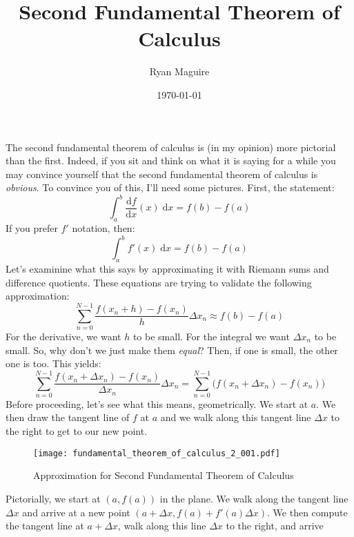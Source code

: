 \documentclass{article}
\title{Second Fundamental Theorem of Calculus}
\author{Ryan Maguire}
\date{\today}
\begin{document}
    \maketitle
    The second fundamental theorem of calculus is (in my opinion) more
    pictorial than the first. Indeed, if you sit and think on what it is saying
    for a while you may convince yourself that the second fundamental theorem
    of calculus is \textit{obvious}. To convince you of this, I'll need some
    pictures. First, the statement:
    \begin{equation}
        \int_{a}^{b}\frac{\textrm{d}f}{\textrm{d}x}(x)\;\textrm{d}x=f(b)-f(a)
    \end{equation}
    If you prefer $f'$ notation, then:
    \begin{equation}
        \int_{a}^{b}f'(x)\;\textrm{d}x=f(b)-f(a)
    \end{equation}
    Let's examinine what this says by approximating it with Riemann sums and
    difference quotients. These equations are trying to validate the
    following approximation:
    \begin{equation}
        \sum_{n=0}^{N-1}\frac{f(x_{n}+h)-f(x_{n})}{h}\Delta{x}_{n}
            \approx{f}(b)-f(a)
    \end{equation}
    For the derivative, we want $h$ to be small. For the integral we want
    $\Delta{x}_{n}$ to be small. So, why don't we just make them
    \textit{equal}? Then, if one is small, the other one is too. This yields:
    \begin{equation}
        \sum_{n=0}^{N-1}\frac{f(x_{n}+\Delta{x}_{n})-f(x_{n})}{\Delta{x}_{n}}
            \Delta{x}_{n}
            =\sum_{n=0}^{N-1}\Big(f(x_{n}+\Delta{x}_{n})-f(x_{n})\Big)
    \end{equation}
    Before proceeding, let's see what this means, geometrically. We start at
    $a$. We then draw the tangent line of $f$ at $a$ and we walk along this
    tangent line $\Delta{x}$ to the right to get to our new point.
    \begin{figure}
        \centering
        \texttt{[image: fundamental\_theorem\_of\_calculus\_2\_001.pdf]}
        \caption{Approximation for Second Fundamental Theorem of Calculus}
    \end{figure}
    Pictorially, we start at $(a,f(a))$ in the plane. We walk along the
    tangent line $\Delta{x}$ and arrive at a new point
    $(a+\Delta{x},f(a)+f'(a)\Delta{x})$. We then compute the tangent line at
    $a+\Delta{x}$, walk along this line $\Delta{x}$ to the right, and arrive
\end{document}
